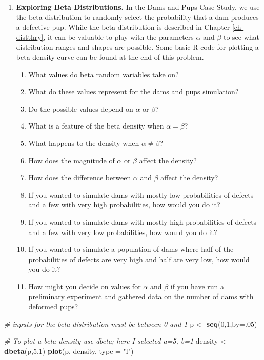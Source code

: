 \documentclass[
]{krantz}
\newenvironment{Shaded}{\begin{snugshade}}{\end{snugshade}}
\newcommand{\CommentTok}[1]{\textcolor[rgb]{0.37,0.37,0.37}{\textit{#1}}}
\newcommand{\DataTypeTok}[1]{\textcolor[rgb]{0.27,0.27,0.27}{#1}}
\newcommand{\DecValTok}[1]{\textcolor[rgb]{0.06,0.06,0.06}{#1}}
\newcommand{\KeywordTok}[1]{\textcolor[rgb]{0.27,0.27,0.27}{\textbf{#1}}}
\newcommand{\NormalTok}[1]{#1}
\newcommand{\StringTok}[1]{\textcolor[rgb]{0.5,0.5,0.5}{#1}}
\providecommand{\tightlist}{%
  \setlength{\itemsep}{0pt}\setlength{\parskip}{0pt}}
\begin{document}
\begin{enumerate}
\def\labelenumi{\arabic{enumi}.}
\item
  \textbf{Exploring Beta Distributions.} In the Dams and Pups Case Study, we use the beta distribution to randomly select the probability that a dam produces a defective pup. While the beta distribution is described in Chapter \ref{ch-distthry}, it can be valuable to play with the parameters \(\alpha\) and \(\beta\) to see what distribution ranges and shapes are possible. Some basic R code for plotting a beta density curve can be found at the end of this problem.

  \begin{enumerate}
  \def\labelenumii{\alph{enumii}.}
  \tightlist
  \item
    What values do beta random variables take on?
  \item
    What do these values represent for the dams and pups simulation?
  \item
    Do the possible values depend on \(\alpha\) or \(\beta\)?
  \item
    What is a feature of the beta density when \(\alpha=\beta\)?
  \item
    What happens to the density when \(\alpha \neq \beta\)?
  \item
    How does the magnitude of \(\alpha\) or \(\beta\) affect the density?
  \item
    How does the difference between \(\alpha\) and \(\beta\) affect the density?
  \item
    If you wanted to simulate dams with mostly low probabilities of defects and a few with very high probabilities, how would you do it?
  \item
    If you wanted to simulate dams with mostly high probabilities of defects and a few with very low probabilities, how would you do it?
  \item
    If you wanted to simulate a population of dams where half of the probabilities of defects are very high and half are very low, how would you do it?
  \item
    How might you decide on values for \(\alpha\) and \(\beta\) if you have run a preliminary experiment and gathered data on the number of dams with deformed pups?
  \end{enumerate}
\end{enumerate}

\begin{Shaded}
\begin{Highlighting}[]
\CommentTok{# inputs for the beta distribution must be between 0 and 1}
\NormalTok{p <-}\StringTok{ }\KeywordTok{seq}\NormalTok{(}\DecValTok{0}\NormalTok{,}\DecValTok{1}\NormalTok{,}\DataTypeTok{by=}\NormalTok{.}\DecValTok{05}\NormalTok{)  }

\CommentTok{# To plot a beta density use dbeta; here I selected a=5, b=1}
\NormalTok{density <-}\StringTok{ }\KeywordTok{dbeta}\NormalTok{(p,}\DecValTok{5}\NormalTok{,}\DecValTok{1}\NormalTok{)}
\KeywordTok{plot}\NormalTok{(p, density, }\DataTypeTok{type =} \StringTok{"l"}\NormalTok{)}
\end{Highlighting}
\end{Shaded}
\end{document}
